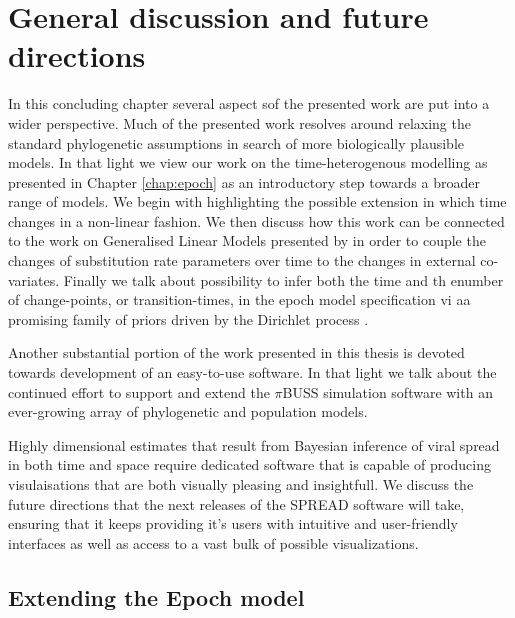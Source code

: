 \chapter{General discussion and future directions}

In this concluding chapter several aspect sof the presented work are put into a wider perspective.
Much of the presented work resolves around relaxing the standard phylogenetic assumptions in search of more biologically plausible models. 
In that light we view our work on the time-heterogenous modelling as presented in Chapter \ref{chap:epoch} as an introductory step towards a broader range of models.
We begin with highlighting the possible extension in which time changes in a non-linear fashion.
We then discuss how this work can be connected to the work on Generalised Linear Models presented by \citet{Lemey2014} in order to couple the changes of substitution rate parameters over time to the changes in external co-variates.
Finally we talk about possibility to infer both the time and th enumber of change-points, or transition-times, in the epoch model specification vi aa promising family of priors driven by the Dirichlet process \citep{Ferguson1973}. 

Another substantial portion of the work presented in this thesis is devoted towards development of an easy-to-use software.
In that light we talk about the continued effort to support and extend the $\pi$BUSS simulation software \citep{bielejec2014} with an ever-growing array of phylogenetic and population models.

Highly dimensional estimates that result from Bayesian inference of viral spread in both time and space require dedicated software that is capable of producing visulaisations that are both visually pleasing and insightfull.
We discuss the future directions that the next releases of the SPREAD software \citep{Bielejec2011} will take, ensuring that it keeps providing it's users with intuitive and user-friendly interfaces as well as access to a vast bulk of possible visualizations.


\section{Extending the Epoch model}























